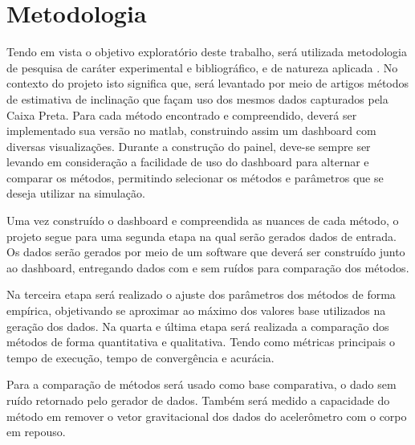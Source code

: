 \section{Metodologia}
Tendo em vista o objetivo exploratório deste trabalho, será utilizada metodologia de pesquisa de caráter experimental e bibliográfico, e de natureza aplicada \cite{tumelero_metodologia_2019, garcia_metodologia_nodate}. No contexto do projeto isto significa que, será levantado por meio de artigos métodos de estimativa de inclinação que façam uso dos mesmos dados capturados pela Caixa Preta. Para cada método encontrado e compreendido, deverá ser implementado sua versão no matlab, construindo assim um dashboard com diversas visualizações. Durante a construção do painel, deve-se sempre ser levando em consideração a facilidade de uso do dashboard para alternar e comparar os métodos, permitindo selecionar os métodos e parâmetros que se deseja utilizar na simulação.

Uma vez construído o dashboard e compreendida as nuances de cada método, o projeto segue para uma segunda etapa na qual serão gerados dados de entrada. Os dados serão gerados por meio de um software que deverá ser construído junto ao dashboard, entregando dados com e sem ruídos para comparação dos métodos.

Na terceira etapa será realizado o ajuste dos parâmetros dos métodos de forma empírica, objetivando se aproximar ao máximo dos valores base utilizados na geração dos dados. Na quarta e última etapa será realizada a comparação dos métodos de forma quantitativa e qualitativa. Tendo como métricas principais o tempo de execução, tempo de convergência e acurácia. 

Para a comparação de métodos será usado como base comparativa, o dado sem ruído retornado pelo gerador de dados. Também será medido a capacidade do método em remover o vetor gravitacional dos dados do acelerômetro com o corpo em repouso.